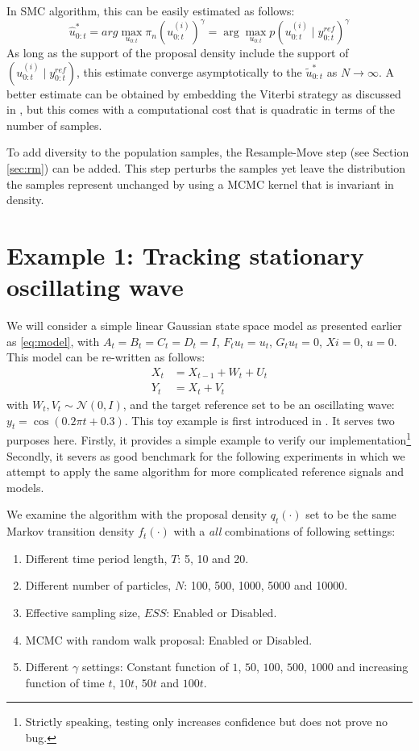 In SMC algorithm, this can be easily estimated as follows:
\begin{equation}
\hat{u}^*_{0:t} = arg\max_{u_{0:t}} \pi_n(u^{(i)}_{0:t})^\gamma = \arg\max_{u_{0:t}} p(u^{(i)}_{0:t} \mid y^{ref}_{0:t})^\gamma
\end{equation}
As long as the support of the proposal density include the support of $(u^{(i)}_{0:t} \mid y^{ref}_{0:t})$, this estimate converge asymptotically to the $\tilde{u}^*_{0:t}$ as $N \to \infty$. A better estimate can be obtained by embedding the Viterbi strategy as discussed in \cite{SG01}, but this comes with a computational cost that is quadratic in terms of the number of samples.

To add diversity to the population samples, the Resample-Move step (see Section \ref{sec:rm}) can be added. This step perturbs the samples yet leave the distribution the samples represent unchanged by using a MCMC kernel that is invariant in density.

\section{Example 1: Tracking stationary oscillating wave}
\label{sec:exp1}
We will consider a simple linear Gaussian state space model as presented earlier as \eqref{eq:model}, with $A_t=B_t=C_t=D_t=I$, $F_t{u_t}=u_t$, $G_t{u_t}=0$, $Xi = 0$, $u=0$. This model can be re-written as follows:
\begin{align}
  X_t &= X_{t-1} + W_t + U_t \nonumber \\
  Y_t &= X_t + V_t
\label{eq:refnmodel}
\end{align}
with $W_t, V_t \sim \mathcal{N}(0,I)$, and the target reference set to be an oscillating wave: $y_t = \cos(0.2 \pi t + 0.3)$. This toy example is first introduced in \cite{NK11}. It serves two purposes here. Firstly, it provides a simple example to verify our implementation\footnote{Strictly speaking, testing only increases confidence but  does not prove no bug.} Secondly, it severs as good benchmark for the following experiments in which we attempt to apply the same algorithm for more complicated reference signals and models.

We examine the algorithm with the proposal density $q_t(\cdot)$ set to be the same Markov transition density $f_t(\cdot)$ with a \emph{all} combinations of following settings:
\begin{enumerate}
\item Different time period length, $T$: 5, 10 and 20.
\item Different number of particles, $N$: 100, 500, 1000, 5000 and 10000.
\item Effective sampling size, $ESS$: Enabled or Disabled.
\item MCMC with random walk proposal: Enabled or Disabled.
\item Different $\gamma$ settings: Constant function of $1$, $50$, $100$, $500$, $1000$ and increasing function of time $t$,  $10t$, $50t$ and $100t$. 
\end{enumerate}

